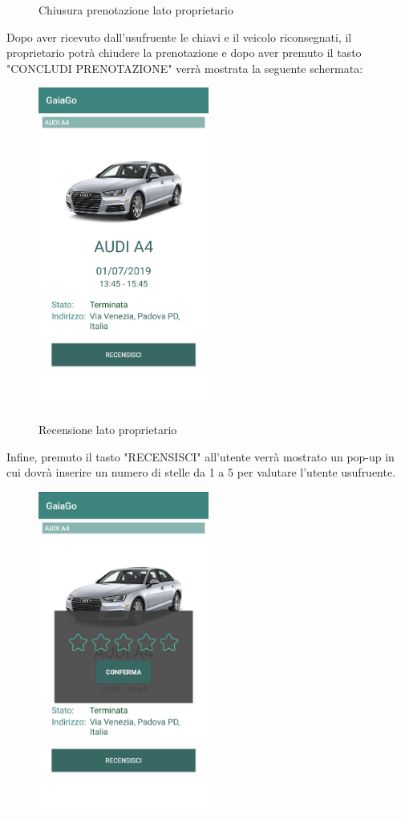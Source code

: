 \begin{itemize}
\begin{figure}[H]
		\caption{Chiusura prenotazione lato proprietario}
		\label{chiusura}
	\end{figure}
\pagebreak
	Dopo aver ricevuto dall'usufruente le chiavi e il veicolo riconsegnati, il proprietario potrà chiudere la prenotazione e dopo aver premuto il tasto "CONCLUDI PRENOTAZIONE" verrà mostrata la seguente schermata:
	\begin{figure}[H] 
		\centering 
		\includegraphics[width=0.5\textwidth]{res/images/recensisci.png}\\
		\caption{Recensione lato proprietario}
		\label{recensione}
	\end{figure}
\pagebreak
	Infine, premuto il tasto "RECENSISCI" all'utente verrà mostrato un pop-up in cui dovrà inserire un numero di stelle da 1 a 5 per valutare l'utente usufruente.
	\begin{figure}[H] 
		\centering 
		\includegraphics[width=0.5\textwidth]{res/images/recensione.png}\\

\end{figure}
\end{itemize}
